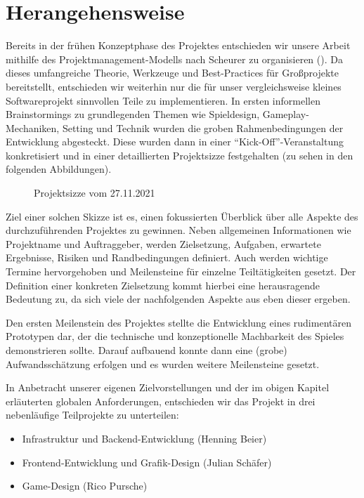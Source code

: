 
\section{Herangehensweise}
Bereits in der frühen Konzeptphase des Projektes entschieden wir unsere Arbeit mithilfe des Projektmanagement-Modells nach Scheurer zu organisieren (\textcite{scheurer}). Da dieses umfangreiche Theorie, Werkzeuge und Best-Practices für Großprojekte bereitstellt, entschieden wir weiterhin nur die für unser vergleichsweise kleines Softwareprojekt sinnvollen Teile zu implementieren.
In ersten informellen Brainstormings zu grundlegenden Themen wie Spieldesign, Gameplay-Mechaniken, Setting und Technik wurden die groben Rahmenbedingungen der Entwicklung abgesteckt. Diese wurden dann in einer \enquote{Kick-Off}-Veranstaltung konkretisiert und in einer detaillierten Projektsizze festgehalten (zu sehen in den folgenden Abbildungen).
\begin{figure}[H]
    \centering
    \label{fig:2021-11-27-projektskizze}
    \caption{Projektsizze vom 27.11.2021}
\end{figure}
Ziel einer solchen Skizze ist es, einen fokussierten Überblick über alle Aspekte des durchzuführenden Projektes zu gewinnen. Neben allgemeinen Informationen wie Projektname und Auftraggeber, werden Zielsetzung, Aufgaben, erwartete Ergebnisse, Risiken und Randbedingungen definiert. Auch werden wichtige Termine hervorgehoben und Meilensteine für einzelne Teiltätigkeiten gesetzt. Der Definition einer konkreten Zielsetzung kommt hierbei eine herausragende Bedeutung zu, da sich viele der nachfolgenden Aspekte aus eben dieser ergeben. 

Den ersten Meilenstein des Projektes stellte die Entwicklung eines rudimentären Prototypen dar, der die technische und konzeptionelle Machbarkeit des Spieles demonstrieren sollte. Darauf aufbauend konnte dann eine (grobe) Aufwandsschätzung erfolgen und es wurden weitere Meilensteine gesetzt.

In Anbetracht unserer eigenen Zielvorstellungen und der im obigen Kapitel erläuterten globalen Anforderungen, entschieden wir das Projekt in drei nebenläufige Teilprojekte zu unterteilen: 
\begin{itemize}
    \item Infrastruktur und Backend-Entwicklung (Henning Beier)
    \item Frontend-Entwicklung und Grafik-Design (Julian Schäfer)
    \item Game-Design (Rico Pursche)
\end{itemize}

